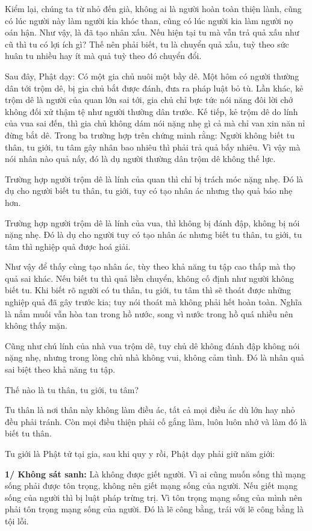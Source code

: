\documentclass[
  12pt,
  oneside]{book}
\begin{document}
Kiểm lại, chúng ta từ nhỏ đến già, không ai là người hoàn toàn thiện lành, cũng có lúc người này làm người kia khóc than, cũng có lúc người kia làm người nọ oán hận. Như vậy, là đã tạo nhân xấu. Nếu hiện tại tu mà vẫn trả quả xấu như cũ thì tu có lợi ích gì? Thế nên phải biết, tu là chuyển quả xấu, tuỳ theo sức huân tu nhiều hay ít mà quả tuỳ theo đó chuyển đổi.

Sau đây, Phật dạy: Có một gia chủ nuôi một bầy dê. Một hôm có người thường dân tới trộm dê, bị gia chủ bắt được đánh, đưa ra pháp luật bỏ tù. Lần khác, kẻ trộm dê là người của quan lớn sai tới, gia chủ chỉ bực tức nói năng đôi lời chớ không đối xử thậm tệ như người thường dân trước. Kế tiếp, kẻ trộm dê do lính của vua sai đến, thì gia chủ không dám nói nặng nhẹ gì cả mà chỉ van xin năn nỉ đừng bắt dê. Trong ba trường hợp trên chứng minh rằng: Người không biết tu thân, tu giới, tu tâm gây nhân bao nhiêu thì phải trả quả bấy nhiêu. Vì vậy mà nói nhân nào quả nấy, đó là dụ người thường dân trộm dê không thế lực.

Trường hợp người trộm dê là lính của quan thì chỉ bị trách móc nặng nhẹ. Đó là dụ cho người biết tu thân, tu giới, tuy có tạo nhân ác nhưng thọ quả báo nhẹ hơn.

Trường hợp người trộm dê là lính của vua, thì không bị đánh đập, không bị nói nặng nhẹ. Đó là dụ cho người tuy có tạo nhân ác nhưng biết tu thân, tu giới, tu tâm thì nghiệp quả được hoá giải.

Như vậy để thấy cùng tạo nhân ác, tùy theo khả năng tu tập cao thấp mà thọ quả sai khác. Nếu biết tu thì quả liền chuyển, không cố định như người không biết tu. Khi biết rõ người có tu thân, tu giới, tu tâm thì sẽ thoát được những nghiệp quả đã gây trước kia; tuy nói thoát mà không phải hết hoàn toàn. Nghĩa là nắm muối vẫn hòa tan trong hồ nước, song vì nước trong hồ quá nhiều nên không thấy mặn.

Cũng như chú lính của nhà vua trộm dê, tuy chủ dê không đánh đập không nói nặng nhẹ, nhưng trong lòng chủ nhà không vui, không cảm tình. Đó là nhân quả sai biệt theo khả năng tu tập.

Thế nào là tu thân, tu giới, tu tâm?

Tu thân là nơi thân này không làm điều ác, tất cả mọi điều ác dù lớn hay nhỏ đều phải tránh. Còn mọi điều thiện phải cố gắng làm, luôn luôn nhớ và làm đó là biết tu thân.

Tu giới là Phật tử tại gia, sau khi quy y rồi, Phật dạy phải giữ năm giới:

\textbf{1/ Không sát sanh:} Là không được giết người. Vì ai cũng muốn sống thì mạng sống phải được tôn trọng, không nên giết mạng sống của người. Nếu giết mạng sống của người thì bị luật pháp trừng trị. Vì tôn trọng mạng sống của mình nên phải tôn trọng mạng sống của người. Đó là lẽ công bằng, trái với lẽ công bằng là tội lỗi.
\end{document}
